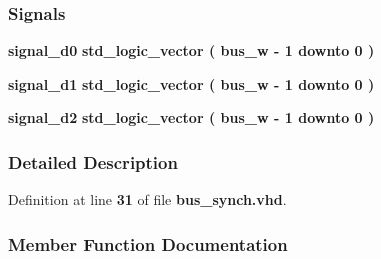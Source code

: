 \subsubsection*{Signals}
 \begin{DoxyCompactItemize}
\item 
{\bf signal\+\_\+d0} {\bfseries \textcolor{comment}{std\+\_\+logic\+\_\+vector}\textcolor{vhdlchar}{ }\textcolor{vhdlchar}{(}\textcolor{vhdlchar}{ }\textcolor{vhdlchar}{ }\textcolor{vhdlchar}{ }\textcolor{vhdlchar}{ }{\bfseries {\bf bus\+\_\+w}} \textcolor{vhdlchar}{-\/}\textcolor{vhdlchar}{ } \textcolor{vhdldigit}{1} \textcolor{vhdlchar}{ }\textcolor{keywordflow}{downto}\textcolor{vhdlchar}{ }\textcolor{vhdlchar}{ } \textcolor{vhdldigit}{0} \textcolor{vhdlchar}{ }\textcolor{vhdlchar}{)}\textcolor{vhdlchar}{ }} 
\item 
{\bf signal\+\_\+d1} {\bfseries \textcolor{comment}{std\+\_\+logic\+\_\+vector}\textcolor{vhdlchar}{ }\textcolor{vhdlchar}{(}\textcolor{vhdlchar}{ }\textcolor{vhdlchar}{ }\textcolor{vhdlchar}{ }\textcolor{vhdlchar}{ }{\bfseries {\bf bus\+\_\+w}} \textcolor{vhdlchar}{-\/}\textcolor{vhdlchar}{ } \textcolor{vhdldigit}{1} \textcolor{vhdlchar}{ }\textcolor{keywordflow}{downto}\textcolor{vhdlchar}{ }\textcolor{vhdlchar}{ } \textcolor{vhdldigit}{0} \textcolor{vhdlchar}{ }\textcolor{vhdlchar}{)}\textcolor{vhdlchar}{ }} 
\item 
{\bf signal\+\_\+d2} {\bfseries \textcolor{comment}{std\+\_\+logic\+\_\+vector}\textcolor{vhdlchar}{ }\textcolor{vhdlchar}{(}\textcolor{vhdlchar}{ }\textcolor{vhdlchar}{ }\textcolor{vhdlchar}{ }\textcolor{vhdlchar}{ }{\bfseries {\bf bus\+\_\+w}} \textcolor{vhdlchar}{-\/}\textcolor{vhdlchar}{ } \textcolor{vhdldigit}{1} \textcolor{vhdlchar}{ }\textcolor{keywordflow}{downto}\textcolor{vhdlchar}{ }\textcolor{vhdlchar}{ } \textcolor{vhdldigit}{0} \textcolor{vhdlchar}{ }\textcolor{vhdlchar}{)}\textcolor{vhdlchar}{ }} 
\end{DoxyCompactItemize}


\subsubsection{Detailed Description}


Definition at line {\bf 31} of file {\bf bus\+\_\+synch.\+vhd}.



\subsubsection{Member Function Documentation}
